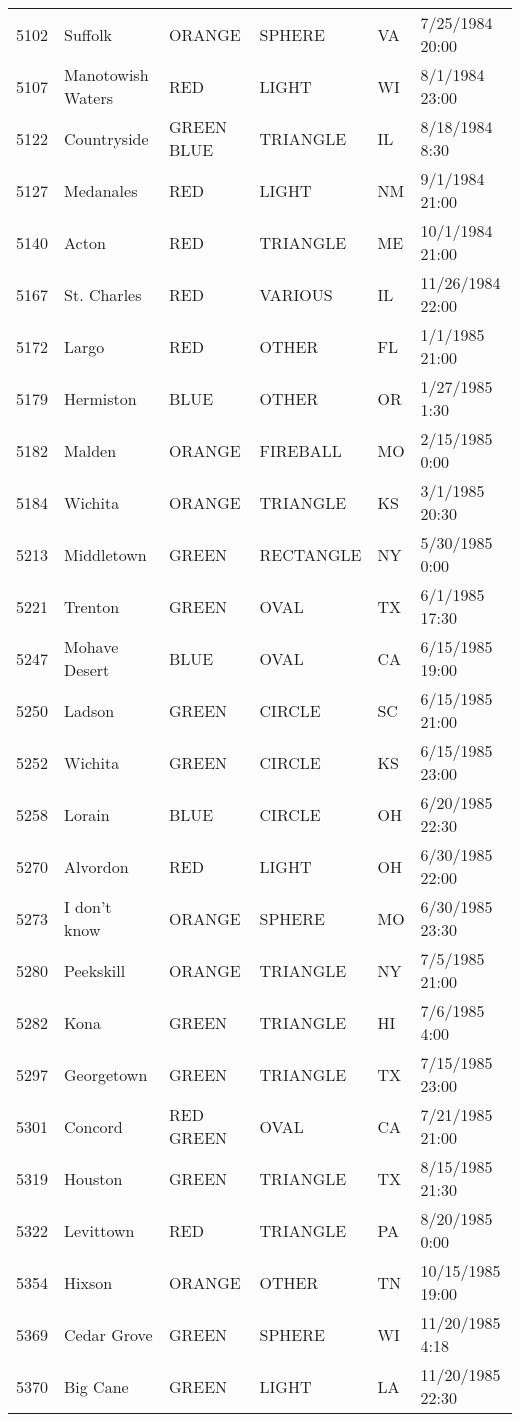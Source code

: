 \begin{tabular}{llllll}
5102 & Suffolk & ORANGE & SPHERE & VA & 7/25/1984 20:00 \\
5107 & Manotowish Waters & RED & LIGHT & WI & 8/1/1984 23:00 \\
5122 & Countryside & GREEN BLUE & TRIANGLE & IL & 8/18/1984 8:30 \\
5127 & Medanales & RED & LIGHT & NM & 9/1/1984 21:00 \\
5140 & Acton & RED & TRIANGLE & ME & 10/1/1984 21:00 \\
5167 & St. Charles & RED & VARIOUS & IL & 11/26/1984 22:00 \\
5172 & Largo & RED & OTHER & FL & 1/1/1985 21:00 \\
5179 & Hermiston & BLUE & OTHER & OR & 1/27/1985 1:30 \\
5182 & Malden & ORANGE & FIREBALL & MO & 2/15/1985 0:00 \\
5184 & Wichita & ORANGE & TRIANGLE & KS & 3/1/1985 20:30 \\
5213 & Middletown & GREEN & RECTANGLE & NY & 5/30/1985 0:00 \\
5221 & Trenton & GREEN & OVAL & TX & 6/1/1985 17:30 \\
5247 & Mohave Desert & BLUE & OVAL & CA & 6/15/1985 19:00 \\
5250 & Ladson & GREEN & CIRCLE & SC & 6/15/1985 21:00 \\
5252 & Wichita & GREEN & CIRCLE & KS & 6/15/1985 23:00 \\
5258 & Lorain & BLUE & CIRCLE & OH & 6/20/1985 22:30 \\
5270 & Alvordon & RED & LIGHT & OH & 6/30/1985 22:00 \\
5273 & I don't know & ORANGE & SPHERE & MO & 6/30/1985 23:30 \\
5280 & Peekskill & ORANGE & TRIANGLE & NY & 7/5/1985 21:00 \\
5282 & Kona & GREEN & TRIANGLE & HI & 7/6/1985 4:00 \\
5297 & Georgetown & GREEN & TRIANGLE & TX & 7/15/1985 23:00 \\
5301 & Concord & RED GREEN & OVAL & CA & 7/21/1985 21:00 \\
5319 & Houston & GREEN & TRIANGLE & TX & 8/15/1985 21:30 \\
5322 & Levittown & RED & TRIANGLE & PA & 8/20/1985 0:00 \\
5354 & Hixson & ORANGE & OTHER & TN & 10/15/1985 19:00 \\
5369 & Cedar Grove & GREEN & SPHERE & WI & 11/20/1985 4:18 \\
5370 & Big Cane & GREEN & LIGHT & LA & 11/20/1985 22:30 \\

\end{tabular}
